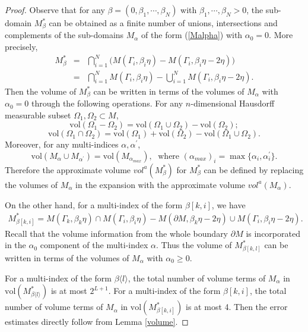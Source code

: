 \documentclass[11pt,letterpaper]{amsart}
\numberwithin{equation}{section}
\theoremstyle{definition}
\theoremstyle{plain}
\theoremstyle{definition}
\theoremstyle{plain}
\theoremstyle{definition}
\theoremstyle{plain}
\newcommand{\vol}{\textrm{vol}}
\begin{document}
\begin{proof}
Observe that for any $\beta=(0,\beta_1,\cdots,\beta_N)$ with $\beta_1,\cdots,\beta_N>0$, the sub-domain $M_{\beta}^{\ast}$ can be obtained as a finite number of unions, intersections and complements of the sub-domains $M_{\alpha}$ of the form (\ref{Malpha}) with $\alpha_0=0$. More precisely,
\begin{eqnarray*}
M_{\beta}^{\ast} &=& \bigcap_{i=1}^N \big( M(\Gamma_i,\beta_i\eta)- M(\Gamma_i,\beta_i\eta-2\eta) \big) \\
&=& \bigcap_{i=1}^N M(\Gamma_i,\beta_i\eta) -\bigcup_{i=1}^N M(\Gamma_i,\beta_i\eta-2\eta).
\end{eqnarray*}
Then the volume of $M_{\beta}^{\ast}$ can be written in terms of the volumes of $M_{\alpha}$ with $\alpha_0=0$ through the following operations. For any $n$-dimensional Hausdorff measurable subset $\Omega_1,\Omega_2\subset M$,
$$\vol(\Omega_1-\Omega_2)=\vol(\Omega_1\cup \Omega_2)-\vol(\Omega_2);$$
$$\vol(\Omega_1\cap\Omega_2) = \vol(\Omega_1)+\vol(\Omega_2)-\vol(\Omega_1\cup\Omega_2).$$
Moreover, for any multi-indices $\alpha, \alpha^{\prime}$,
$$\vol(M_{\alpha}\cup M_{\alpha^{\prime}})=\vol(M_{\alpha_{max}}), \;\textrm{ where } (\alpha_{max})_i=\max\{\alpha_i,\alpha_i^{\prime}\}.$$
Therefore the approximate volume $vol^a(M_{\beta}^{\ast})$ for $M_{\beta}^{\ast}$ can be defined by replacing the volumes of $M_{\alpha}$ in the expansion with the approximate volume $vol^a(M_{\alpha})$. 

On the other hand, for a multi-index of the form $\beta[k,i]$, we have
\begin{eqnarray*}
M_{\beta[k,i]}^{\ast} = M(\Gamma_k,\beta_k\eta)\cap M(\Gamma_i,\beta_i\eta)-M(\partial M,\beta_k\eta-2\eta)\cup M(\Gamma_i,\beta_i\eta-2\eta).
\end{eqnarray*}
Recall that the volume information from the whole boundary $\partial M$ is incorporated in the $\alpha_0$ component of the multi-index $\alpha$. Thus the volume of $M_{\beta[k,l]}^{\ast}$ can be written in terms of the volumes of $M_{\alpha}$ with $\alpha_0\geqslant 0$.

For a multi-index of the form $\beta\langle l\rangle$, the total number of volume terms of $M_{\alpha}$ in $\vol(M_{\beta\langle l \rangle}^{\ast})$ is at most $2^{L+1}$. For a multi-index of the form $\beta[k,i]$, the total number of volume terms of $M_{\alpha}$ in $\vol(M_{\beta[k,i]}^{\ast})$ is at most 4. Then the error estimates directly follow from Lemma \ref{volume}.
\end{proof}
\end{document}
